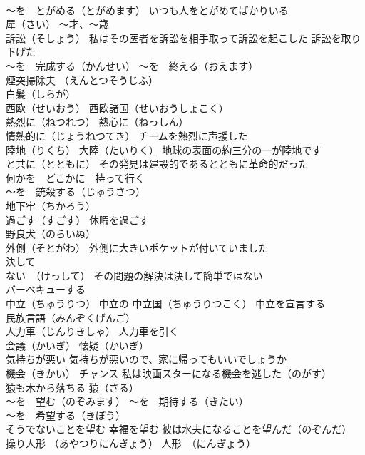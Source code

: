 \documentclass[8pt]{extreport}
\begin{document}
\begin{CJK}{UTF8}{min}
\\	～を　とがめる（とがめます） いつも人をとがめてばかりいる
\\	犀（さい） ～才、～歳 
\\	訴訟（そしょう） 私はその医者を訴訟を相手取って訴訟を起こした 訴訟を取り下げた
\\	～を　完成する（かんせい） ～を　終える（おえます）
\\	煙突掃除夫 （えんとつそうじふ）
\\	白髪（しらが）
\\	西欧（せいおう） 西欧諸国（せいおうしょこく）
\\	熱烈に（ねつれつ） 熱心に（ねっしん）
\\	情熱的に（じょうねつてき） チームを熱烈に声援した
\\	陸地（りくち） 大陸（たいりく） 地球の表面の約三分の一が陸地です
\\	と共に（とともに） その発見は建設的であるとともに革命的だった
\\	何かを　どこかに　持って行く
\\	～を　銃殺する（じゅうさつ）
\\	地下牢（ちかろう）
\\	過ごす（すごす） 休暇を過ごす
\\	野良犬（のらいぬ）
\\	外側（そとがわ） 外側に大きいポケットが付いていました
\\	決して
\\	ない　（けっして） その問題の解決は決して簡単ではない
\\	バーベキューする
\\	中立（ちゅうりつ） 中立の 中立国（ちゅうりつこく） 中立を宣言する
\\	民族言語（みんぞくげんご）
\\	人力車（じんりきしゃ） 人力車を引く
\\	会議（かいぎ） 懐疑（かいぎ） 
\\	気持ちが悪い 気持ちが悪いので、家に帰ってもいいでしょうか
\\	機会（きかい） チャンス 私は映画スターになる機会を逃した（のがす）
\\	猿も木から落ちる 猿（さる）
\\	～を　望む（のぞみます） ～を　期待する（きたい）
\\	～を　希望する（きぼう）
\\	そうでないことを望む 幸福を望む 彼は水夫になることを望んだ（のぞんだ）
\\	操り人形 （あやつりにんぎょう） 人形　（にんぎょう）

\end{CJK}
\end{document}

